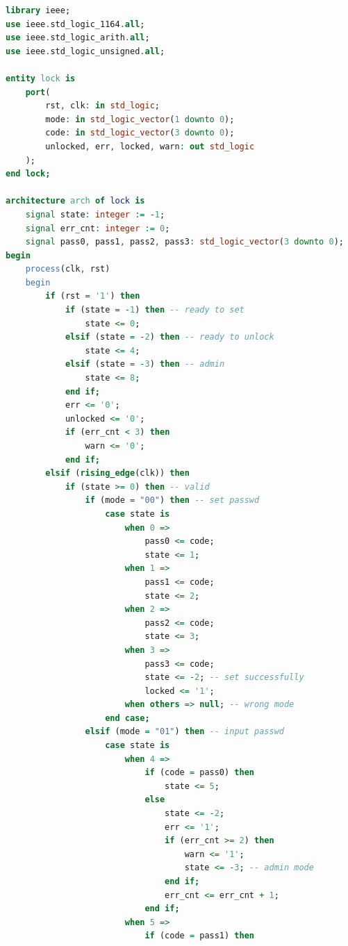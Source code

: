 \documentclass[a4paper]{article}
\begin{document}
\begin{lstlisting}[language=vhdl]
library ieee;
use ieee.std_logic_1164.all;
use ieee.std_logic_arith.all;
use ieee.std_logic_unsigned.all;

entity lock is
    port(
        rst, clk: in std_logic;
        mode: in std_logic_vector(1 downto 0);
        code: in std_logic_vector(3 downto 0);
        unlocked, err, locked, warn: out std_logic
    );
end lock;

architecture arch of lock is
    signal state: integer := -1;
    signal err_cnt: integer := 0;
    signal pass0, pass1, pass2, pass3: std_logic_vector(3 downto 0);
begin
    process(clk, rst)
    begin
        if (rst = '1') then
            if (state = -1) then -- ready to set
                state <= 0;
            elsif (state = -2) then -- ready to unlock
                state <= 4;
            elsif (state = -3) then -- admin
                state <= 8;
            end if;
            err <= '0';
            unlocked <= '0';
            if (err_cnt < 3) then
                warn <= '0';
            end if;
        elsif (rising_edge(clk)) then
            if (state >= 0) then -- valid
                if (mode = "00") then -- set passwd
                    case state is
                        when 0 =>
                            pass0 <= code;
                            state <= 1;
                        when 1 =>
                            pass1 <= code;
                            state <= 2;
                        when 2 =>
                            pass2 <= code;
                            state <= 3;
                        when 3 =>
                            pass3 <= code;
                            state <= -2; -- set successfully
                            locked <= '1';
                        when others => null; -- wrong mode
                    end case;
                elsif (mode = "01") then -- input passwd
                    case state is
                        when 4 =>
                            if (code = pass0) then
                                state <= 5;
                            else
                                state <= -2;
                                err <= '1';
                                if (err_cnt >= 2) then
                                    warn <= '1';
                                    state <= -3; -- admin mode
                                end if;
                                err_cnt <= err_cnt + 1;
                            end if;
                        when 5 =>
                            if (code = pass1) then

\end{lstlisting}
\end{document}
